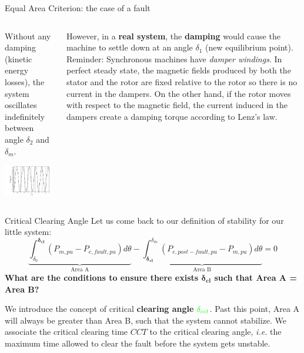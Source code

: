 \begin{frame}[allowframebreaks]{Equal Area Criterion: the case of a fault}
\begin{columns}
    \begin{column}{0.5\textwidth}
        Without any damping (kinetic energy losses), the system oscillates indefinitely between angle $\delta_2$ and $\delta_m$.
        \begin{center}
        \includegraphics[width=0.95\textwidth]{images/RotorOscillation.png}
        \end{center}
    \end{column}
    \begin{column}{0.5\textwidth}
        However, in a \textbf{real system}, the \textbf{damping} would cause the machine to settle down at an angle $\delta_1$ (new equilibrium point).
        \vspace{\baselineskip}
        {\scriptsize
        Reminder: Synchronous machines have \emph{damper windings}. 
        In perfect steady state, the magnetic fields produced by both the stator and the rotor are fixed relative to the rotor so there is no current in the dampers. On the other hand, if the rotor moves with respect to the magnetic field, the current induced in the dampers create a damping torque according to Lenz's law.}
    \end{column}
\end{columns}
\end{frame}

\begin{frame} {Critical Clearing Angle}
Let us come back to our definition of stability for our little system:
$$\underbrace{\int_{\delta_0}^{\mathbf{\delta_{cl}}} \left(P_{m,pu}-P_{e,fault,pu}\right) d\theta}_{\text{Area A}} - \underbrace{\int_{\mathbf{\delta_{cl}}}^{\delta_{m}} \left(P_{e,post-fault,pu}-P_{m,pu}\right) d\theta}_{\text{Area B}} = 0$$
\textbf{What are the conditions to ensure there exists $\mathbf{\delta_{cl}}$ such that Area A = Area B?}

We introduce the concept of critical \textbf{clearing angle} $\mathcolor{green}{\delta_{cct}}$. Past this point, Area A will always be greater than Area B, such that the system cannot stabilize. We associate the critical clearing time $CCT$ to the critical clearing angle, \emph{i.e.} the maximum time allowed to clear the fault before the system gets unstable.
\end{frame}

